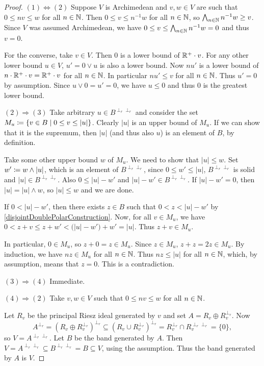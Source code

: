 \begin{proof}
$(1) \Leftrightarrow (2)$ Suppose $V$ is Archimedean and $v,w\in V$ are such that $0\leq nv\leq w$ for all $n\in \mathbb{N}$. Then $0\leq v\leq n^{-1}w$ for all $n\in \mathbb{N}$, so $\bigwedge_{n\in \mathbb{N}}n^{-1}w \geq v$. Since $V$ was assumed Archimedean, we have $0\leq v \leq \bigwedge_{n\in \mathbb{N}}n^{-1}w = 0$ and thus $v = 0$.

For the converse, take $v\in V$. Then $0$ is a lower bound of $\mathbb{R}^+\cdot v$. For any other lower bound $u\in V$, $u' = 0\vee u$ is also a lower bound. Now $nu'$ is a lower bound of $n\cdot \mathbb{R}^+\cdot v = \mathbb{R}^+\cdot v$ for all $n\in \mathbb{N}$. In particular $nu'\leq v$ for all $n\in \mathbb{N}$. Thus $u'=0$ by assumption. Since $u\vee 0 = u' = 0$, we have $u\leq 0$ and thus $0$ is the greatest lower bound.

$(2) \Rightarrow (3)$ Take arbitrary $u\in B^{\perp_r\perp_r}$ and consider the set $M_u \defeq \setbuilder{v\in B}{0\leq v \leq |u|}$. Clearly $|u|$ is an upper bound of $M_u$. If we can show that it is the supremum, then $|u|$ (and thus also $u$) is an element of $B$, by definition.

Take some other upper bound $w$ of $M_u$. We need to show that $|u|\leq w$. Set $w'\coloneqq w\wedge |u|$, which is an element of $B^{\perp_r\perp_r}$, since $0\leq w' \leq |u|$, $B^{\perp_r\perp_r}$ is solid and $|u|\in B^{\perp_r\perp_r}$. Also $0\leq |u| - w'$ and $|u|-w'\in B^{\perp_r\perp_r}$. If $|u|- w' = 0$, then $|u| = |u|\wedge w$, so $|u|\leq w$ and we are done.

If $0 < |u|- w'$, then there exists $z\in B$ such that $0< z < |u|-w'$ by \ref{disjointDoublePolarConstruction}. Now, for all $v\in M_u$, we have $0 < z+v \leq z+w' < \big(|u|-w'\big)+w' = |u|$. Thus $z+v\in M_u$.

In particular, $0\in M_u$, so $z+0 = z\in M_u$. Since $z\in M_u$, $z+z = 2z\in M_u$. By induction, we have $nz\in M_u$ for all $n\in\mathbb{N}$. Thus $nz\leq |u|$ for all $n\in \mathbb{N}$, which, by assumption, means that $z=0$. This is a contradiction.

$(3) \Rightarrow (4)$ Immediate.

$(4) \Rightarrow (2)$ Take $v,w\in V$ such that $0\leq nv\leq w$ for all $n\in \mathbb{N}$.

Let $R_v$ be the principal Riesz ideal generated by $v$ and set $A = R_v \oplus R_v^{\perp_r}$. Now
\[ A^{\perp_r} = (R_v \oplus R_v^{\perp_r})^{\perp_r} \subseteq (R_v \cup R_v^{\perp_r})^{\perp_r} = R_v^{\perp_r} \cap R_v^{\perp_r\perp_r} = \{0\}, \]
so $V = A^{\perp_r\perp_r}$. Let $B$ be the band generated by $A$. Then $V = A^{\perp_r\perp_r} \subseteq B^{\perp_r\perp_r} = B \subseteq V$, using the assumption. Thus the band generated by $A$ is $V$. 


\end{proof}
